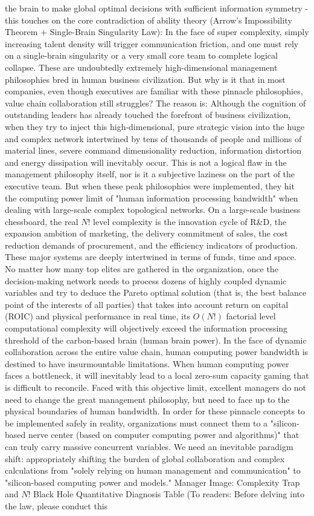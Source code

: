 \documentclass[11pt,a4paper]{article}
\begin{document}
the brain to make global optimal decisions with sufficient information symmetry - this touches on the core contradiction of ability theory (Arrow's Impossibility Theorem + Single-Brain Singularity Law): In the face of super complexity, simply increasing talent density will trigger communication friction, and one must rely on a single-brain singularity or a very small core team to complete logical collapse. These are undoubtedly extremely high-dimensional management philosophies bred in human business civilization. But why is it that in most companies, even though executives are familiar with these pinnacle philosophies, value chain collaboration still struggles? The reason is: Although the cognition of outstanding leaders has already touched the forefront of business civilization, when they try to inject this high-dimensional, pure strategic vision into the huge and complex network intertwined by tens of thousands of people and millions of material lines, severe command dimensionality reduction, information distortion and energy dissipation will inevitably occur. This is not a logical flaw in the management philosophy itself, nor is it a subjective laziness on the part of the executive team. But when these peak philosophies were implemented, they hit the computing power limit of "human information processing bandwidth" when dealing with large-scale complex topological networks. On a large-scale business chessboard, the real $N!$ level complexity is the innovation cycle of R\&D, the expansion ambition of marketing, the delivery commitment of sales, the cost reduction demands of procurement, and the efficiency indicators of production. These major systems are deeply intertwined in terms of funds, time and space. No matter how many top elites are gathered in the organization, once the decision-making network needs to process dozens of highly coupled dynamic variables and try to deduce the Pareto optimal solution (that is, the best balance point of the interests of all parties) that takes into account return on capital (ROIC) and physical performance in real time, its $O(N!)$ factorial level computational complexity will objectively exceed the information processing threshold of the carbon-based brain (human brain power). In the face of dynamic collaboration across the entire value chain, human computing power bandwidth is destined to have insurmountable limitations. When human computing power faces a bottleneck, it will inevitably lead to a local zero-sum capacity gaming that is difficult to reconcile. Faced with this objective limit, excellent managers do not need to change the great management philosophy, but need to face up to the physical boundaries of human bandwidth. In order for these pinnacle concepts to be implemented safely in reality, organizations must connect them to a "silicon-based nerve center (based on computer computing power and algorithms)" that can truly carry massive concurrent variables. We need an inevitable paradigm shift: appropriately shifting the burden of global collaboration and complex calculations from "solely relying on human management and communication" to "silicon-based computing power and models." Manager Image: Complexity Trap and $N!$ Black Hole Quantitative Diagnosis Table (To readers: Before delving into the law, please conduct this 
\end{document}
